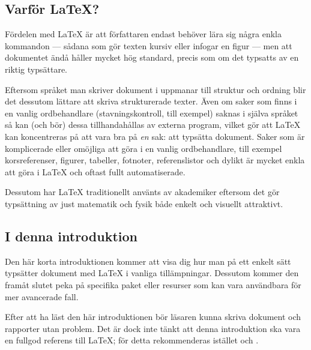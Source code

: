 \documentclass[swe,10pt,nofont]{skrapport}
\makeatletter
\let\@oldLaTeX\LaTeX
\def\LaTeX{\texorpdfstring{\@oldLaTeX}{LaTeX}}
\makeatother
\begin{document}
	\addcontentsline{toc}{subsection}{Varför \LaTeX{}?}
	\subsection*{Varför \LaTeX?}
	Fördelen med \LaTeX{} är att författaren endast behöver lära sig några
	enkla kommandon — sådana som gör texten kursiv eller infogar en figur
	— men att dokumentet ändå håller mycket hög standard, precis som om
	det typsatts av en riktig typsättare.
	
	Eftersom språket man skriver dokument i uppmanar till struktur och ordning
	blir det dessutom lättare att skriva strukturerade texter. Även om saker
	som finns i en vanlig ordbehandlare (stavningskontroll, till exempel) saknas i
	själva språket så kan (och bör) dessa tillhandahållas av externa program,
	vilket gör att \LaTeX{} kan koncentreras på att vara bra på \emph{en} sak:
	att typsätta dokument. Saker som är komplicerade eller omöjliga att göra
	i en vanlig ordbehandlare, till exempel korsreferenser, figurer, tabeller,
	fotnoter, referenslistor och dylikt är mycket enkla att göra i \LaTeX{}
	och oftast fullt automatiserade.
	
	Dessutom har \LaTeX{} traditionellt använts av akademiker eftersom det gör 
	typsättning av just matematik och fysik både enkelt och visuellt attraktivt. 
	
	\vspace{-1em}
	\subsection*{I denna introduktion}
	Den här korta introduktionen kommer att visa dig hur man på ett enkelt
	sätt typsätter dokument med \LaTeX{} i vanliga tillämpningar.
	Dessutom kommer den framåt slutet peka på specifika paket eller
	resurser som kan vara användbara för mer avancerade fall.
	
	Efter att ha läst den här introduktionen bör läsaren kunna skriva
	dokument och rapporter utan problem. Det är dock inte tänkt att denna
	introduktion ska vara en fullgod referens till \LaTeX; för detta
	rekommenderas istället  och
	.
	
\end{document}
